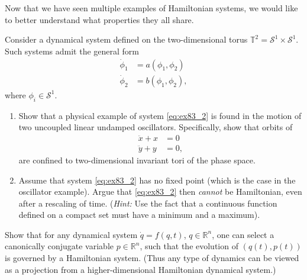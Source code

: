 Now that we have seen multiple examples of Hamiltonian systems, we would like to better understand what properties they all share.

\begin{exercise}
Consider a dynamical system defined on the two-dimensional torus $\mathbb{T}^{2}=\mathcal{S}^{1}\times \mathcal{S}^{1}$.
Such systems admit the general form
\begin{align}
\dot{\phi}_{1} & =  a(\phi_{1},\phi_{2})\\
\dot{\phi}_{2} & =  b(\phi_{1},\phi_{2}),\label{eq:ex83_2}
\end{align}
where $\phi_{i}\in \mathcal{S}^{1}$.

\begin{enumerate}
	\item Show that a physical example of system \eqref{eq:ex83_2} is found in
the motion of two uncoupled linear undamped oscillators. Specifically,
show that orbits of 
\begin{align}
\ddot{x}+x & =  0\\
\ddot{y}+y & =  0,
\end{align}
are confined to two-dimensional invariant tori of the phase space.

\item Assume that system \eqref{eq:ex83_2} has no fixed point (which is the
	case in the oscillator example). Argue that \eqref{eq:ex83_2} then \emph{cannot}
be Hamiltonian, even after a rescaling of time. (\emph{Hint:} Use
the fact that a continuous function defined on a compact set must
have a minimum and a maximum). 
\end{enumerate}
\end{exercise}

\begin{exercise}
Show that for any dynamical system $\dot{q}=f(q,t)$, $q\in\mathbb{R}^{n}$, one can select a canonically conjugate variable $p\in\mathbb{R}^{n}$, such that the evolution of $(q(t),p(t))$ is governed by a Hamiltonian system. (Thus any type of dynamics can be viewed as a projection from a higher-dimensional Hamiltonian dynamical system.)	
\end{exercise}


